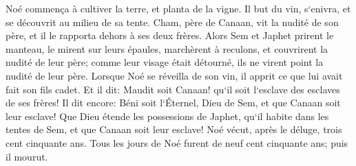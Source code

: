\verse Noé commença à cultiver la terre, et planta de la vigne. 
\verse Il but du vin, s`enivra, et se découvrit au milieu de sa tente. 
\verse Cham, père de Canaan, vit la nudité de son père, et il le rapporta dehors à ses deux frères. 
\verse Alors Sem et Japhet prirent le manteau, le mirent sur leurs épaules, marchèrent à reculons, et couvrirent la nudité de leur père; comme leur visage était détourné, ils ne virent point la nudité de leur père. 
\verse Lorsque Noé se réveilla de son vin, il apprit ce que lui avait fait son fils cadet. 
\verse Et il dit: Maudit soit Canaan! qu`il soit l`esclave des esclaves de ses frères! 
\verse Il dit encore: Béni soit l`Éternel, Dieu de Sem, et que Canaan soit leur esclave! 
\verse Que Dieu étende les possessions de Japhet, qu`il habite dans les tentes de Sem, et que Canaan soit leur esclave! 
\verse Noé vécut, après le déluge, trois cent cinquante ans. 
\verse Tous les jours de Noé furent de neuf cent cinquante ans; puis il mourut. 


